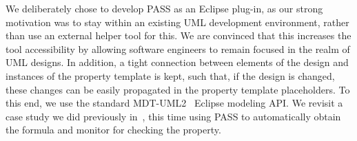 \documentclass[letter]{llncs}
\begin{document}
We deliberately chose to develop PASS as an Eclipse plug-in, as
our strong motivation was to stay within an existing UML development
environment, rather than use an external helper tool for this.  We are
convinced that this increases the tool accessibility by allowing software
engineers to remain focused in the realm of UML designs.  In addition,
a tight connection between elements of the design and instances of the property
template is kept, such that, if the design is changed, these changes can
be easily propagated in the property template placeholders.  To this end,
we use the standard MDT-UML2~\cite{MDTUML2} Eclipse modeling API.
We revisit a case study we did previously
in~\cite{DBLP:dblp_conf/nfm/RemenskaTWHVCB13}, this time using PASS
to automatically obtain the formula and monitor for checking the
property.\medskip
\end{document}
